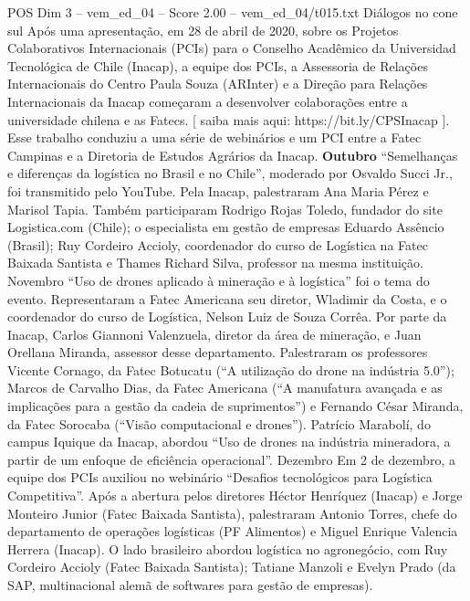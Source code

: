 \begin{textsample}{POS Dim 3 – vem\_ed\_04 – Score 2.00 – vem\_ed\_04/t015.txt}  \label{ex:f3_pos_148}
Diálogos no cone sul Após uma apresentação, em 28 de abril de 2020, sobre os Projetos Colaborativos Internacionais (PCIs) para o Conselho Acadêmico da Universidad Tecnológica de Chile (Inacap), a equipe dos PCIs, a Assessoria de Relações Internacionais do Centro Paula Souza (ARInter) e a Direção para Relações Internacionais da Inacap começaram a desenvolver colaborações entre a universidade chilena e as Fatecs. [ saiba mais aqui: https://bit.ly/CPSInacap ].
Esse trabalho conduziu a uma série de webinários e um PCI entre a Fatec Campinas e a Diretoria de Estudos Agrários da Inacap. \textbf{Outubro} “Semelhanças e diferenças da logística no Brasil e no Chile”, moderado por Osvaldo Succi Jr., foi transmitido pelo YouTube.
Pela Inacap, palestraram Ana Maria Pérez e Marisol Tapia.
Também participaram Rodrigo Rojas Toledo, fundador do site Logistica.com (Chile); o especialista em gestão de empresas Eduardo Assêncio (Brasil); Ruy Cordeiro Accioly, coordenador do curso de Logística na Fatec Baixada Santista e Thames Richard Silva, professor na mesma instituição.
Novembro “Uso de drones aplicado à mineração e à logística” foi o tema do evento.
Representaram a Fatec Americana seu diretor, Wladimir da Costa, e o coordenador do curso de Logística, Nelson Luiz de Souza Corrêa.
Por parte da Inacap, Carlos Giannoni Valenzuela, diretor da área de mineração, e Juan Orellana Miranda, assessor desse departamento.
Palestraram os professores Vicente Cornago, da Fatec Botucatu (“A utilização do drone na indústria 5.0”); Marcos de Carvalho Dias, da Fatec Americana (“A manufatura avançada e as implicações para a gestão da cadeia de suprimentos”) e Fernando César Miranda, da Fatec Sorocaba (“Visão computacional e drones”).
Patrício Marabolí, do campus Iquique da Inacap, abordou “Uso de drones na indústria mineradora, a partir de um enfoque de eficiência operacional”.
Dezembro Em 2 de dezembro, a equipe dos PCIs auxiliou no webinário “Desafios tecnológicos para Logística Competitiva”.
Após a abertura pelos diretores Héctor Henríquez (Inacap) e Jorge Monteiro Junior (Fatec Baixada Santista), palestraram Antonio Torres, chefe do departamento de operações logísticas (PF Alimentos) e Miguel Enrique Valencia Herrera (Inacap).
O lado brasileiro abordou logística no agronegócio, com Ruy Cordeiro Accioly (Fatec Baixada Santista); Tatiane Manzoli e Evelyn Prado (da SAP, multinacional alemã de softwares para gestão de empresas).

\end{textsample}
